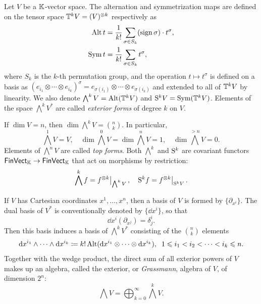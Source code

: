 \begin{defn}
    Let $V$ be a $\mathbb{K}$-vector space. The alternation and symmetrization maps are defined on the tensor space $\mathbb{T}^k V=(V)^{\otimes k}$ respectively as
    \begin{align}
        \operatorname{Alt} t&=\frac{1}{k!}\sum_{\sigma\in S_k} (\operatorname{sign}\sigma)\cdot t^\sigma,\\
        \operatorname{Sym} t&=\frac{1}{k!}\sum_{\sigma\in S_k} t^\sigma,\label{def sym operator}
    \end{align}
    where $S_k$ is the $k$-th permutation group, and the operation $t\mapsto t^\sigma$ is defined on a basis as $(e_{i_1}\otimes\cdots\otimes e_{i_k})^\sigma=e_{\sigma(i_1)}\otimes\cdots\otimes e_{\sigma(i_k)}$ and extended to all of $\mathbb{T}^k V$ by linearity. We also denote $\bigwedge^k V=\operatorname{Alt}(\mathbb{T}^k V)$ and $\mathrm{S}^k V=\operatorname{Sym}(\mathbb{T}^k V)$. Elements of the space $\bigwedge^k V^\ast$ are called \emph{exterior forms} of degree $k$ on $V$. 
    
    If $\dim V=n$, then $\dim \bigwedge^k V=\binom{n}{k}$. In particular, 
    \[\bigwedge^1 V=V,\quad \dim \bigwedge^0 V=\dim \bigwedge^n V=1,\quad \dim \bigwedge^{>n} V=0.\]
    Elements of $\bigwedge^n V$ are called \emph{top forms}.
    Both $\bigwedge^k$ and $\mathrm{S}^k$ are covariant functors $\mathsf{FinVect}_{\mathbb{K}}\to\mathsf{FinVect}_{\mathbb{K}}$ that act on morphisms by restriction: \[\bigwedge^k f=\restr{f^{\otimes k}}{\bigwedge^k V},\quad \rmS^k f=\restr{f^{\otimes k}}{\rmS^k V}.\]
\end{defn}

If $V$ has Cartesian coordinates $x^1,\ldots,x^n$, then a basis of $V$ is formed by $\{\partial_{x^i}\}$. The dual basis of $V^\ast$ is conventionally denoted by $\{\dd x^i\}$, so that
\[
    \dd x^i\left(\partial_{x^j}\right)=\delta^i_j.
\]
Then this basis induces a basis of $\bigwedge^k V^\ast$ consisting of the $\binom{n}{k}$ elements
\[
{\mathrm{d}} x^{i_1}\wedge \cdots \wedge {\mathrm{d}} x^{i_k}\coloneqq k!\operatorname{Alt}({\mathrm{d}} x^{i_1}\otimes\cdots\otimes {\mathrm{d}} x^{i_k}),\;\;1\leqslant i_1<i_2<\cdots<i_k\leqslant n.
\]
Together with the wedge product, the direct sum of all exterior powers of $V$ makes up an algebra, called the exterior, or \emph{Grassmann}, algebra of $V$, of dimension $2^n$:
\[\bigwedge V=\bigoplus_{k=0}^\infty \bigwedge^k V.\]



